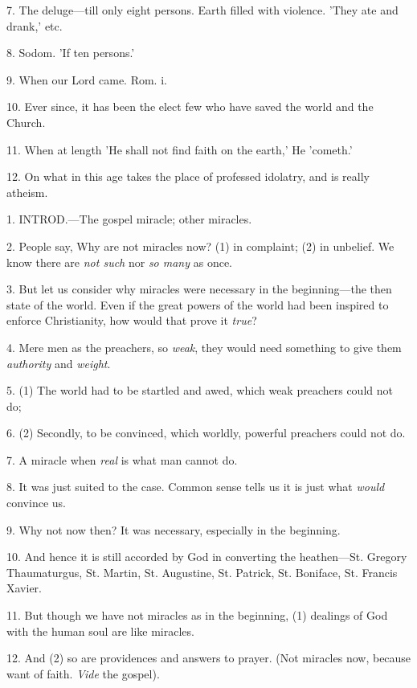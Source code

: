 7. The deluge—till only eight persons. Earth
filled with violence. 'They ate and drank,' etc.

8. Sodom. 'If ten persons.'

9. When our Lord came. Rom. i.

10. Ever since, it has been the elect few who
have saved the world and the Church.

11. When at length 'He shall not find faith on
the earth,' He 'cometh.'

12. On what in this age takes the place of
professed idolatry, and is really atheism.


1. INTROD.—The
gospel miracle; other miracles.

2. People say, Why are not miracles now? (1) in
complaint; (2) in unbelief. We know there are \emph{not such} nor \emph{so
many} as once.

3. But let us consider why miracles were
necessary in the beginning—the then state of the world. Even if the
great powers of the world had been inspired to enforce Christianity,
how would that prove it \emph{true}?

4. Mere men as the preachers, so \emph{weak},
they would need something to give them \emph{authority} and \emph{weight}.

5. (1) The world had to be startled and awed,
which weak preachers could not do;

6. (2) Secondly, to be convinced, which worldly,
powerful preachers could not do.

7. A miracle when \emph{real} is what man cannot
do.

8. It was just suited to the case. Common sense
tells us it is just what \emph{would} convince us.

9. Why not now then? It was necessary, especially
in the beginning.

10. And hence it is still accorded by God in
converting the heathen—St. Gregory Thaumaturgus, St. Martin, St.
Augustine, St. Patrick, St. Boniface, St. Francis Xavier.

11. But though we have not miracles as in the
beginning, (1) dealings of God with the human soul are like miracles.

12. And (2) so are providences and answers to
prayer. (Not miracles now, because want of faith. \emph{Vide} the
gospel).


